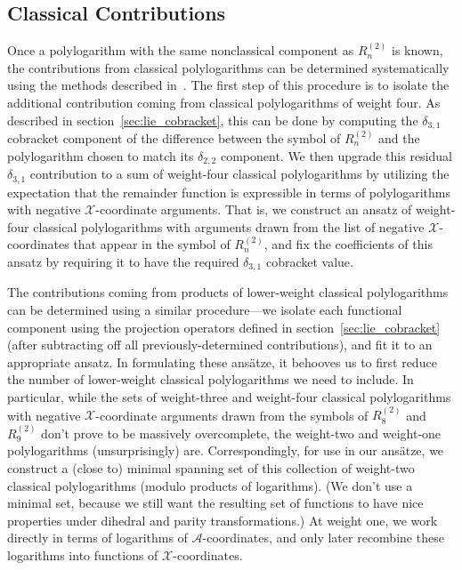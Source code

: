 \documentclass[11pt]{article}
\def\x{\mathcal{X}}
\def\a{\mathcal{A}}
\begin{document}

\subsection{Classical Contributions}

Once a polylogarithm with the same nonclassical component as $R_n^{(2)}$\! is known, the contributions from classical polylogarithms can be determined systematically using the methods described in~\cite{Goncharov:2010jf,Golden:2014xqf}. The first step of this procedure is to isolate the additional contribution coming from classical polylogarithms of weight four. As described in section~\ref{sec:lie_cobracket}, this can be done by computing the $\delta_{3,1}$ cobracket component of the difference between the symbol of $R_n^{(2)}$\! and the polylogarithm chosen to match its $\delta_{2,2}$ component. We then upgrade this residual $\delta_{3,1}$ contribution to a sum of weight-four classical polylogarithms by utilizing the expectation that the remainder function is expressible in terms of polylogarithms with negative $\x$-coordinate arguments. That is, we construct an ansatz of weight-four classical polylogarithms with arguments drawn from the list of negative $\x$-coordinates that appear in the symbol of $R_n^{(2)}$\!, and fix the coefficients of this ansatz by requiring it to have the required $\delta_{3,1}$ cobracket value.

The contributions coming from products of lower-weight classical polylogarithms can be determined using a similar procedure---we isolate each functional component using the projection operators defined in section~\ref{sec:lie_cobracket} (after subtracting off all previously-determined contributions), and fit it to an appropriate ansatz. In formulating these ans\"atze, it behooves us to first reduce the number of lower-weight classical polylogarithms we need to include. In particular, while the sets of weight-three and weight-four classical polylogarithms with negative $\x$-coordinate arguments drawn from the symbols of $R_8^{(2)}$\! and $R_9^{(2)}$\! don't prove to be massively overcomplete, the weight-two and weight-one polylogarithms (unsurprisingly) are. Correspondingly, for use in our ans\"atze, we construct a (close to) minimal spanning set of this collection of weight-two classical polylogarithms (modulo products of logarithms). (We don't use a minimal set, because we still want the resulting set of functions to have nice properties under dihedral and parity transformations.) At weight one, we work directly in terms of logarithms of $\a$-coordinates, and only later recombine these logarithms into functions of $\x$-coordinates.  
\end{document}
